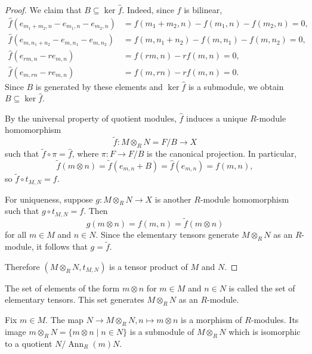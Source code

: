 \begin{proof}
    We claim that $B \subseteq \ker \hat{f}$. Indeed, since $f$ is bilinear,
    \begin{align*}
        \hat{f}(e_{m_1+m_2,n}-e_{m_1,n}-e_{m_2,n}) & = f(m_1+m_2,n)-f(m_1,n)-f(m_2,n) = 0, \\
        \hat{f}(e_{m,n_1+n_2}-e_{m,n_1}-e_{m,n_2}) & = f(m,n_1+n_2)-f(m,n_1)-f(m,n_2) = 0, \\
        \hat{f}(e_{rm,n}-r e_{m,n})                & = f(rm,n)-r f(m,n) = 0,               \\
        \hat{f}(e_{m,rn}-r e_{m,n})                & = f(m,rn)-r f(m,n) = 0.
    \end{align*}
    Since $B$ is generated by these elements and $\ker \hat{f}$ is a submodule, we obtain $B \subseteq \ker \hat{f}$.

    By the universal property of quotient modules, $\hat{f}$ induces a unique $R$-module homomorphism
    \[
        \tilde{f}\colon M\otimes_R N = F/B \to X
    \]
    such that $\tilde{f} \circ \pi = \hat{f}$, where $\pi\colon F \to F/B$ is the canonical projection. In particular,
    \[
        \tilde{f}(m\otimes n)
        =
        \tilde{f}(e_{m,n}+B)
        =
        \hat{f}(e_{m,n})
        =
        f(m,n),
    \]
    so $\tilde{f} \circ t_{M,N} = f$.

    For uniqueness, suppose $g\colon M\otimes_R N \to X$ is another $R$-module homomorphism such that $g \circ t_{M,N} = f$. Then
    \[
        g(m\otimes n) = f(m,n) = \tilde{f}(m\otimes n)
    \]
    for all $m\in M$ and $n\in N$. Since the elementary tensors generate $M\otimes_R N$ as an $R$-module, it follows that $g=\tilde{f}$.

    Therefore $(M\otimes_R N, t_{M,N})$ is a tensor product of $M$ and $N$.
\end{proof}

\begin{definition}
    The set of elements of the form $m \otimes n$ for $m \in M$ and $n \in N$ is called the set of elementary tensors. This set generates $M \otimes_R N$ as an $R$-module.
\end{definition}

\begin{example}
    Fix $m \in M$. The map $N \to M \otimes_R N, n \mapsto m \otimes n$ is a morphism of $R$-modules. Its image $m \otimes_R N = \{m \otimes n \mid n \in N\}$ is a submodule of $M \otimes_R N$ which is isomorphic to a quotient $N/\operatorname{Ann}_R(m)N$.
\end{example}

